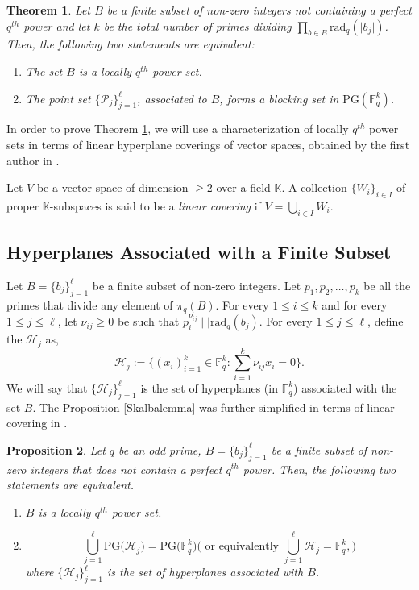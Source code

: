 \documentclass[12pt]{amsart}
\newtheorem{theorem}{Theorem}[section]
\newtheorem{proposition}[theorem]{Proposition}
\newcommand{\F}{{\mathbb F}}
\newcommand{\PG}{\mathrm{PG}}
\begin{document}
\begin{theorem}
Let $B$ be a finite subset of non-zero integers not containing a perfect $q^{th}$ power and let $k$ be the total number of primes dividing $\prod_{b\in B} \text{rad}_{q}(\lvert b_{j} \rvert)$. Then, the following two statements are equivalent:
\begin{enumerate}
        \item The set $B$ is a locally $q^{th}$ power set. 
        
        \item The point set $\{\mathcal{P}_{j}\}_{j=1}^{\ell}$, associated to $B$, forms a blocking set in $\PG(\F_{q}^{k})$. 
    \end{enumerate}
    \label{mainresult}
\end{theorem}
In order to prove Theorem \ref{mainresult}, we will use a characterization of locally $q^{th}$ power sets in terms of linear hyperplane coverings of vector spaces, obtained by the first author in \cite{mishra2023prime}.


Let $V$ be a vector space of dimension $\geq 2$ over a field $\mathbb{K}$. A collection $\{W_{i}\}_{i\in I}$ of proper $\mathbb{K}$-subspaces is said to be a \textit{linear covering} if $V = \bigcup_{i \in I} W_{i}$. 


\subsection{Hyperplanes Associated with a Finite Subset}\label{hyperplanes}
Let $B = \{b_{j}\}_{j=1}^{\ell}$ be a finite subset of non-zero integers. Let $p_{1}, p_{2}, \ldots, p_{k}$ be all the primes that divide any element of $\pi_{q}(B)$. For every $1 \leq i \leq k$ and for every $1 \leq j \leq \ell$, let $\nu_{ij}\geq 0$ be such that $p_{i}^{\nu_{ij}}\mid\mid \text{rad}_{q}(b_{j})$. For every $1 \leq j \leq \ell$, define the $\mathcal{H}_{j}$ as, 
\[\mathcal{H}_{j} := \big\{ (x_{i})_{i=1}^{k} \in\mathbb{F}_{q}^{k} : \sum_{i=1}^{k} \nu_{ij} x_{i} = 0 \big\}.\] We will say that $\{\mathcal{H}_{j}\}_{j=1}^{\ell}$ is the set of hyperplanes (in $\mathbb{F}_{q}^{k}$) associated with the set $B$. The Proposition \ref{Skalbalemma} was further simplified in terms of linear covering in \cite{mishra2023prime}. 

\begin{proposition}  \label{th:connectioncoveringqpowerset} 
Let $q$ be an odd prime, $B = \{b_{j}\}_{j=1}^{\ell}$ be a finite subset of non-zero integers that does not contain a perfect $q^{th}$ power. Then, the following two statements are equivalent. 
\begin{enumerate}
    \item $B$ is a locally $q^{th}$ power set. 

    \item \[\bigcup_{j=1}^{\ell} \PG\big(\mathcal{H}_{j}\big) = \PG(\mathbb{F}_{q}^{k}\big) \Bigg( \text{ or equivalently } \bigcup_{j=1}^{\ell} \mathcal{H}_{j} = \F_{q}^{k}, \Bigg)\] where $\{\mathcal{H}_{j}\}_{j=1}^{\ell}$ is the set of hyperplanes associated with $B$.
\end{enumerate}
\end{proposition}
\end{document}
